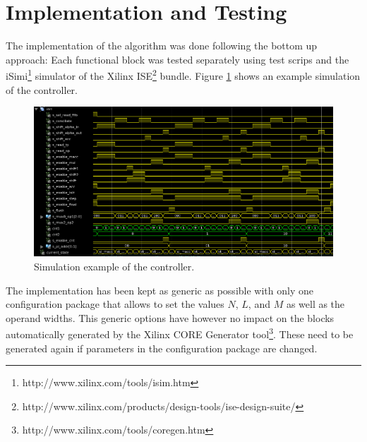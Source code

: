 \documentclass[mscthesis]{usiinfthesis}
\begin{document}
\section{Implementation and Testing}

The implementation of the algorithm was done following the bottom up
approach: Each functional block was tested separately using test scrips
and the iSimi\footnote{http://www.xilinx.com/tools/isim.htm} simulator of the
Xilinx
ISE\footnote{http://www.xilinx.com/products/design-tools/ise-design-suite/}
bundle. Figure \ref{fig:test_ctrl} shows an example simulation of the
controller.

\begin{figure}
    \includegraphics[width=1\columnwidth]{./schema/test_ctrl.png}
    \caption{Simulation example of the controller.}
    \label{fig:test_ctrl}
\end{figure}

The implementation has been kept as generic as possible with only one
configuration package that allows to set the values $N$, $L$, and $M$ as well as
the operand widths. This generic options have however no impact on the blocks
automatically generated by the Xilinx CORE Generator
tool\footnote{http://www.xilinx.com/tools/coregen.htm}. These need to be
generated again if parameters in the configuration package are changed.
\end{document}
